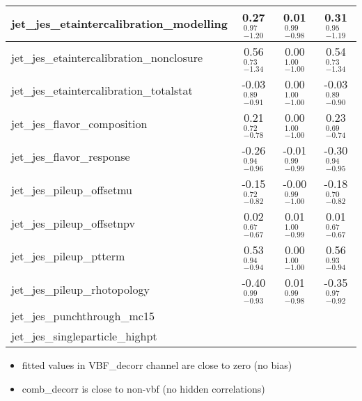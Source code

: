 \documentclass{beamer}
\begin{document}
\begin{frame}
\begin{table}
{{\begin{tabular}{| l | c | c | c|}
jet\_jes\_etaintercalibration\_modelling &  0.27 \boldmath${^{ 0.97}_{-1.20}}$      &  0.01 \boldmath${^{ 0.99}_{-0.98}}$   &  0.31 \boldmath${^{ 0.95}_{-1.19}}$      \\ \hline
jet\_jes\_etaintercalibration\_nonclosure&  0.56 \boldmath${^{ 0.73}_{-1.34}}$      &  0.00 \boldmath${^{ 1.00}_{-1.00}}$   &  0.54 \boldmath${^{ 0.73}_{-1.34}}$      \\ \hline
jet\_jes\_etaintercalibration\_totalstat & -0.03 \boldmath${^{ 0.89}_{-0.91}}$      &  0.00 \boldmath${^{ 1.00}_{-1.00}}$   & -0.03 \boldmath${^{ 0.89}_{-0.90}}$      \\ \hline
jet\_jes\_flavor\_composition            &  0.21 \boldmath${^{ 0.72}_{-0.78}}$      &  0.00 \boldmath${^{ 1.00}_{-1.00}}$   &  0.23 \boldmath${^{ 0.69}_{-0.74}}$      \\ \hline
jet\_jes\_flavor\_response               & -0.26 \boldmath${^{ 0.94}_{-0.96}}$      & -0.01 \boldmath${^{ 0.99}_{-0.99}}$   & -0.30 \boldmath${^{ 0.94}_{-0.95}}$      \\ \hline
jet\_jes\_pileup\_offsetmu               & -0.15 \boldmath${^{ 0.72}_{-0.82}}$      & -0.00 \boldmath${^{ 0.99}_{-1.00}}$   & -0.18 \boldmath${^{ 0.70}_{-0.82}}$      \\ \hline
jet\_jes\_pileup\_offsetnpv              &  0.02 \boldmath${^{ 0.67}_{-0.67}}$      &  0.01 \boldmath${^{ 1.00}_{-0.99}}$   &  0.01 \boldmath${^{ 0.67}_{-0.67}}$      \\ \hline
jet\_jes\_pileup\_ptterm                 &  0.53 \boldmath${^{ 0.94}_{-0.94}}$      &  0.00 \boldmath${^{ 1.00}_{-1.00}}$   &  0.56 \boldmath${^{ 0.93}_{-0.94}}$      \\ \hline
jet\_jes\_pileup\_rhotopology            & -0.40 \boldmath${^{ 0.99}_{-0.93}}$      &  0.01 \boldmath${^{ 0.99}_{-0.98}}$   & -0.35 \boldmath${^{ 0.97}_{-0.92}}$      \\ \hline
jet\_jes\_punchthrough\_mc15             &                                        &                                       &                                        \\ \hline
jet\_jes\_singleparticle\_highpt         &                                        &                                       &                                        \\ \hline

\end{tabular}
}}
\end{table}

\begin{itemize}
  \item fitted values in VBF\_decorr channel are close to zero (no bias)
  \item comb\_decorr is close to non-vbf (no hidden correlations)
 \end{itemize}

\end{frame}
\end{document}
